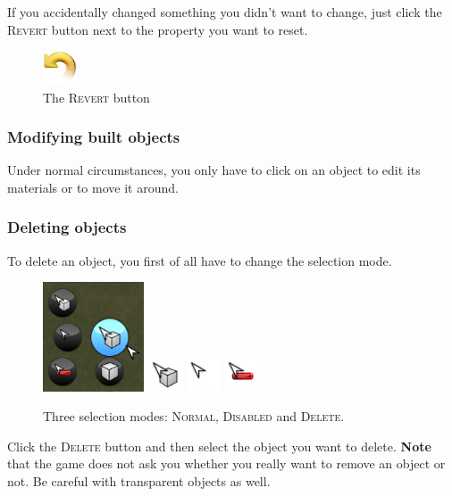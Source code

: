 \documentclass[a4paper]{article}
\newcommand{\ccaption}[1]{\textsc{#1}}
\newcommand{\note}[1]{\textbf{Note} #1 \par}
\begin{document}
If you accidentally changed something you didn't want to change, just click the \ccaption{Revert} button next to the property you want to
reset.
\begin{figure}[h]
  \begin{center}
    \includegraphics[width=10mm]{../images/edit-undo.png}
  \end{center}
  \caption{The \ccaption{Revert} button}
\end{figure}

\subsubsection{Modifying built objects}
Under normal circumstances, you only have to click on an object to edit its materials or to move it around.

\subsubsection{Deleting objects}
To delete an object, you first of all have to change the selection mode.
\begin{figure}[h]
  \begin{center}
    \includegraphics[width=30mm]{../images/selectionmodes.png}
    \includegraphics[width=10mm]{../images/selection-default.png}
    \includegraphics[width=10mm]{../images/selection-none.png}
    \includegraphics[width=10mm]{../images/selection-remove.png}
  \end{center}
  \caption{Three selection modes: \ccaption{Normal}, \ccaption{Disabled} and \ccaption{Delete}.}
\end{figure}
Click the \ccaption{Delete} button and then select the object you want to delete. \note{that the game does not ask you whether you really
want to remove an object or not. Be careful with transparent objects as well.}
\end{document}

